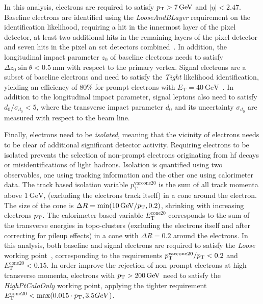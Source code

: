 In this analysis, electrons are required to satisfy $p_{\textrm{T}} > \SI{7}{GeV}$ and $\vert\eta\vert<2.47$. Baseline electrons are identified using the \textit{LooseAndBLayer} requirement on the identification likelihood, requiring a hit in the innermost layer of the pixel detector, at least two additional hits in the remaining layers of the pixel detector and seven hits in the pixel an \gls{sct} detectors combined~\cite{PERF-2017-01}. In addition, the longitudinal impact parameter $z_0$ of baseline electrons needs to satisfy $\Delta z_0\sin\theta < \SI{0.5}{\milli\meter}$ with respect to the primary vertex. Signal electrons are a subset of baseline electrons and need to satisfy the \textit{Tight} likelihood identification, yielding an efficiency of 80\% for prompt electrons with $E_\mathrm{T}=\SI{40}{\GeV}$~\cite{PERF-2017-01}. In addition to the longitudinal impact parameter, signal leptons also need to satisfy $d_0/\sigma_{d_0} < 5$, where the transverse impact parameter $d_0$ and its uncertainty $\sigma_{d_0}$ are measured with respect to the beam line. 

Finally, electrons need to be \textit{isolated}, meaning that the vicinity of electrons needs to be clear of additional significant detector activity. Requiring electrons to be isolated prevents the selection of non-prompt electrons originating \eg from \gls{hf} decays or misidentifications of light hadrons. Isolation is quantified using two observables, one using tracking information and the other one using calorimeter data. The track based isolation variable $p_{\mathrm{T}}^{\mathrm{varcone20}}$ is the sum of all track momenta above $\SI{1}{\GeV}$, (excluding the electrons track itself) in a cone around the electron. The size of the cone is $\Delta R = \min (\SI{10}{\GeV}/\pt,0.2)$, \ie shrinking with increasing electrons $p_{\textrm{T}}$. The calorimeter based variable $E_{\mathrm{T}}^{\mathrm{cone20}}$ corresponds to the sum of the transverse energies in topo-clusters (excluding the electrons itself and after correcting for pileup effects) in a cone with $\Delta R = 0.2$ around the electrons. In this analysis, both baseline and signal electrons are required to satisfy the \textit{Loose} working point~\cite{EGAM-2018-01}, corresponding to the requirements $p_{\mathrm{T}}^{\mathrm{varcone20}}/p_{\textrm{T}} < 0.2$ and $E_{\mathrm{T}}^{\mathrm{cone20}} < 0.15$. In order improve the rejection of non-prompt electrons at high transverse momenta, electrons with $\pt >\SI{200}{\GeV}$ need to satisfy the \textit{HighPtCaloOnly} working point, applying the tighter requirement $E_{\mathrm{T}}^{\mathrm{cone20}} < \max (0.015\cdot p_{\textrm{T}},3.5GeV)$. 

